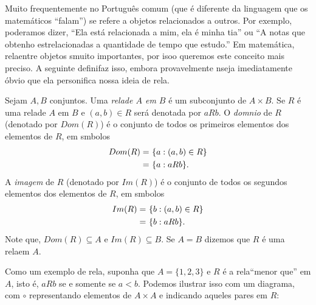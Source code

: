 Muito frequentemente no Portugu\^es comum (que \'e diferente da linguagem que os matem\'aticos ``falam'') se refere a objetos relacionados a outros. Por exemplo, poder\ih amos dizer, ``Ela est\'a relacionada a mim, ela \'e minha tia'' ou ``A notas que obtenho est\ao relacionadas a quantidade de tempo que estudo.'' Em matem\'atica, rela\coes entre objetos s\ao muito importantes, por isoo queremos este conceito mais preciso. A seguinte defini\cao faz isso, embora provavelmente n\ao seja imediatamente \'obvio  que ela personifica nossa ideia de rela\caoi. 
\begin{definb}
Sejam $A,B$ conjuntos. Uma {\it rela\cao de $A$ em $B$} \'e um subconjunto de $A\times B$. Se $R$ \'e uma rela\cao de $A$ em $B$ e $(a,b)\in R$ ser\'a denotada por $aRb$. O {\it dom\ih nio} de $R$ (denotado por $Dom(R)$) \'e o conjunto de todos os primeiros elementos dos elementos de $R$, em s\ih mbolos
\begin{equation*}
 \begin{aligned}
Dom(R)=&\textrm{ } \{a: (a,b)\in R\}\\
      =&\textrm{ } \{a: aRb\}.
 \end{aligned}
\end{equation*}  
A {\it imagem} de $R$ (denotado por $Im(R)$) \'e o conjunto de todos os segundos elementos dos elementos de $R$, em s\ih mbolos
\begin{equation*}
 \begin{aligned}
Im(R)=&\textrm{ } \{b: (a,b)\in R\}\\
     =&\textrm{ } \{b: aRb\}.
 \end{aligned}
\end{equation*}
Note que, $Dom(R)\subseteq A$ e $Im(R)\subseteq B$. Se $A=B$ dizemos que $R$ \'e uma rela\cao em $A$. 
\end{definb}

Como um exemplo de rela\caoi, suponha que $A=\{1,2,3\}$ e $R$ \'e a rela\cao ``menor que'' em $A$, isto \'e, $aRb$ se e somente se $a<b$. Podemos ilustrar isso com um diagrama, com $\circ$ representando elementos de $A\times A$ e \frame{$\circ$} indicando aqueles pares em $R$:

